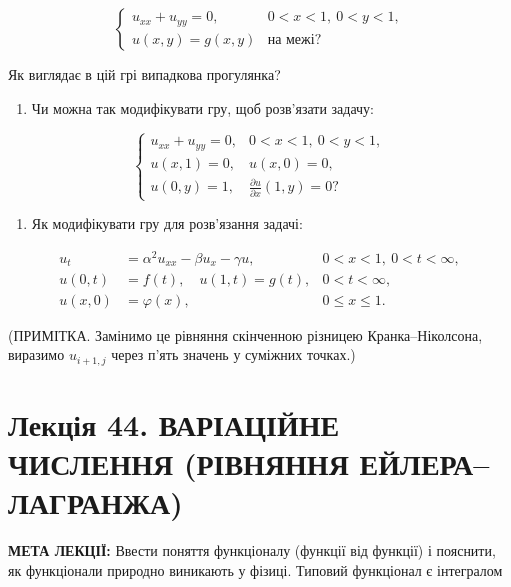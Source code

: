\documentclass[
  ukrainian,
]{article}
\providecommand{\tightlist}{%
  \setlength{\itemsep}{0pt}\setlength{\parskip}{0pt}}
\begin{document}
\[
\begin{cases}u_{xx} + u_{yy} = 0, & 0 < x < 1,\ 0 < y < 1, \\u(x, y) = g(x, y) & \text{на межі?}\end{cases}
\]

Як виглядає в цій грі випадкова прогулянка?

\begin{enumerate}
\def\labelenumi{\arabic{enumi}.}
\setcounter{enumi}{3}
\tightlist
\item
  Чи можна так модифікувати гру, щоб розв'язати задачу:
\end{enumerate}

\[
\begin{cases}u_{xx} + u_{yy} = 0, & 0 < x < 1,\ 0 < y < 1, \\u(x, 1) = 0, & u(x, 0) = 0, \\u(0, y) = 1, & \tfrac{\partial u}{\partial x}(1, y) = 0?\end{cases}
\]

\begin{enumerate}
\def\labelenumi{\arabic{enumi}.}
\setcounter{enumi}{4}
\tightlist
\item
  Як модифікувати гру для розв'язання задачі:
\end{enumerate}

\[
\begin{aligned}u_t &= \alpha^2 u_{xx} - \beta u_x - \gamma u, & 0 < x < 1,\ 0 < t < \infty, \\u(0,t) &= f(t),\quad u(1,t) = g(t), & 0 < t < \infty, \\u(x,0) &= \varphi(x), & 0 \le x \le 1.\end{aligned}
\]

(ПРИМІТКА. Замінимо це рівняння скінченною різницею Кранка--Ніколсона,
виразимо \(u_{i+1,j}\) через п'ять значень у суміжних точках.)

\section{Лекція 44. ВАРІАЦІЙНЕ ЧИСЛЕННЯ (РІВНЯННЯ
ЕЙЛЕРА--ЛАГРАНЖА)}\label{ux43bux435ux43aux446ux456ux44f-44.-ux432ux430ux440ux456ux430ux446ux456ux439ux43dux435-ux447ux438ux441ux43bux435ux43dux43dux44f-ux440ux456ux432ux43dux44fux43dux43dux44f-ux435ux439ux43bux435ux440ux430ux43bux430ux433ux440ux430ux43dux436ux430}

\textbf{МЕТА ЛЕКЦІЇ:} Ввести поняття функціоналу (функції від функції) і
пояснити, як функціонали природно виникають у фізиці. Типовий функціонал
є інтегралом
\end{document}
